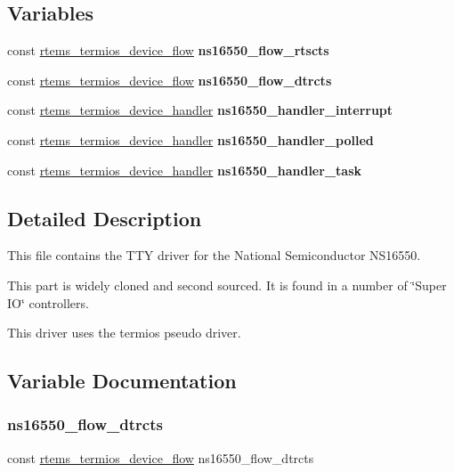 \subsection*{Variables}
\begin{DoxyCompactItemize}
\item 
const \mbox{\hyperlink{structrtems__termios__device__flow}{rtems\+\_\+termios\+\_\+device\+\_\+flow}} {\bfseries ns16550\+\_\+flow\+\_\+rtscts}
\item 
const \mbox{\hyperlink{structrtems__termios__device__flow}{rtems\+\_\+termios\+\_\+device\+\_\+flow}} {\bfseries ns16550\+\_\+flow\+\_\+dtrcts}
\item 
const \mbox{\hyperlink{structrtems__termios__device__handler}{rtems\+\_\+termios\+\_\+device\+\_\+handler}} {\bfseries ns16550\+\_\+handler\+\_\+interrupt}
\item 
const \mbox{\hyperlink{structrtems__termios__device__handler}{rtems\+\_\+termios\+\_\+device\+\_\+handler}} {\bfseries ns16550\+\_\+handler\+\_\+polled}
\item 
const \mbox{\hyperlink{structrtems__termios__device__handler}{rtems\+\_\+termios\+\_\+device\+\_\+handler}} {\bfseries ns16550\+\_\+handler\+\_\+task}
\end{DoxyCompactItemize}


\subsection{Detailed Description}
This file contains the T\+TY driver for the National Semiconductor N\+S16550.

This part is widely cloned and second sourced. It is found in a number of \char`\"{}\+Super I\+O\char`\"{} controllers.

This driver uses the termios pseudo driver. 

\subsection{Variable Documentation}
\mbox{\label{ns16550-context_8c_a7b7f34aabc3b3251adf7bdcaa4844a4b}} 
\subsubsection{\texorpdfstring{ns16550\_flow\_dtrcts}{ns16550\_flow\_dtrcts}}
{\footnotesize\ttfamily const \mbox{\hyperlink{structrtems__termios__device__flow}{rtems\+\_\+termios\+\_\+device\+\_\+flow}} ns16550\+\_\+flow\+\_\+dtrcts}

